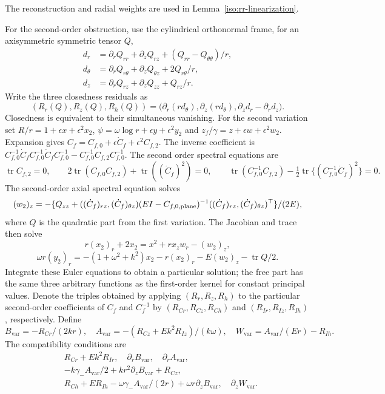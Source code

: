\documentclass[11pt,a4paper]{article}
\numberwithin{equation}{section}
\theoremstyle{plain}
\theoremstyle{definition}
\theoremstyle{remark}
\begin{document}
The reconstruction and radial weights are used in
Lemma~\ref{iso:rr-linearization}.

For the second-order obstruction, use the
cylindrical orthonormal frame, for an axisymmetric symmetric tensor $Q$,
\begin{align*}
 d_r&=\partial_rQ_{rr}+\partial_zQ_{rz}+(Q_{rr}-Q_{\theta\theta})/r,\\
 d_\theta&=\partial_rQ_{r\theta}+\partial_zQ_{\theta z}+2Q_{r\theta}/r,\\
 d_z&=\partial_rQ_{rz}+\partial_zQ_{zz}+Q_{rz}/r.
\end{align*}
Write the three closedness residuals as
\[
 (R_r(Q),R_z(Q),R_h(Q))
   =\bigl(\partial_r(rd_\theta),\partial_z(rd_\theta),
                     \partial_zd_r-\partial_rd_z\bigr).
\]
Closedness is equivalent to their simultaneous vanishing. For the second variation set
$R/r=1+\epsilon x+\epsilon^2x_2$,
$\psi=\omega\log r+\epsilon y+\epsilon^2y_2$ and
$z_f/\gamma=z+\epsilon w+\epsilon^2w_2$.
Expansion gives $C_f=C_{f,0}+\epsilon \dot C_f+\epsilon^2C_{f,2}$.
The inverse coefficient is
$C_{f,0}^{-1}\dot C_f C_{f,0}^{-1}\dot C_f C_{f,0}^{-1}-C_{f,0}^{-1}C_{f,2} C_{f,0}^{-1}$.
The second order spectral equations are
\[
 \operatorname{tr}C_{f,2}=0,\qquad
 2\operatorname{tr}(C_{f,0}C_{f,2})+\operatorname{tr}((\dot C_f)^2)=0,\qquad
 \operatorname{tr}(C_{f,0}^{-1}C_{f,2})
  -\tfrac12\operatorname{tr}\{(C_{f,0}^{-1}\dot C_f)^2\}=0.
\]
The second-order axial spectral equation solves
\[
 (w_2)_z=-\{Q_{zz}+((\dot C_f)_{rz},(\dot C_f)_{\theta z})
 (EI-C_{f,0,\rm plane})^{-1}((\dot C_f)_{rz},(\dot C_f)_{\theta z})^{\top}\}/(2E),
\]
where $Q$ is the quadratic part from the first variation.  The Jacobian
and trace then solve
\[
 r(x_2)_r+2x_2=x^2+rx_zw_r-(w_2)_z,
\]
\[
 \omega r(y_2)_r=-(1+\omega^2+k^2)x_2-r(x_2)_r
                         -E(w_2)_z-\operatorname{tr}Q/2.
\]
Integrate these Euler equations to obtain a particular solution; the free
part has the same three arbitrary functions as the first-order
kernel for constant principal values. Denote the triples obtained by applying
$(R_r,R_z,R_h)$ to the particular second-order coefficients of $C_f$
and $C_f^{-1}$ by $(R_{Cr},R_{Cz},R_{Ch})$ and
$(R_{Ir},R_{Iz},R_{Ih})$, respectively. Define
\[
 B_{\mathrm{var}}=-R_{Cr}/(2kr),\quad
 A_{\mathrm{var}}=-(R_{Cz}+Ek^2R_{Iz})/(k\omega),\quad
 W_{\mathrm{var}}=A_{\mathrm{var}} /(Er)-R_{Ih}.
\]
The compatibility conditions are
\begin{align*}
 &R_{Cr}+Ek^2R_{Ir},\quad \partial_rB_{\mathrm{var}},\quad\partial_rA_{\mathrm{var}},\\
 &-k\gamma_-A_{\mathrm{var}}/2+kr^2\partial_zB_{\mathrm{var}}+R_{Cz},\\
 &R_{Ch}+ER_{Ih}-\omega\gamma_-A_{\mathrm{var}}/(2r)+\omega r\partial_zB_{\mathrm{var}},
 \quad\partial_zW_{\mathrm{var}}.
\end{align*}
\end{document}
